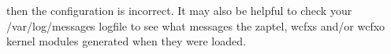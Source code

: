 then the configuration is incorrect. It may also be helpful to check your /var/log/messages logfile to see what messages the zaptel, wcfxs and/or wcfxo kernel modules generated when they were loaded.


